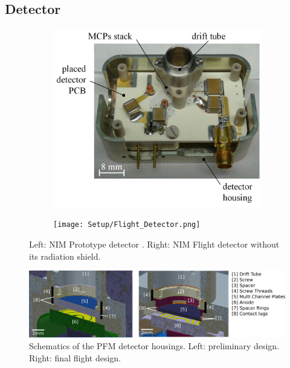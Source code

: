 			

		\subsection{Detector }\label{subsubsec:SetFacPumpst} %
		\begin{figure}[h] %
			\begin{subfigure}{0.5\textwidth}
				\centering
				\includegraphics[width=\textwidth]{Setup/Prototype_Detector.png}
			\end{subfigure}
			\begin{subfigure}{0.5\textwidth}
				\centering
				\texttt{[image: Setup/Flight\_Detector.png]}
			\end{subfigure}
			\caption{Left: NIM Prototype detector \cite{Diss_Meyer}. Right: NIM Flight detector without its radiation shield.}
			\label{fig:DetPhotos}
		\end{figure}
		\begin{figure}[h] %
			\centering
			\includegraphics[width= \textwidth]{Setup/PFMDetectors.png}
			\caption{Schematics of the PFM detector housings. Left: preliminary design. Right: final flight design.}
			\label{fig:FlightDetSchemata}
		\end{figure}
